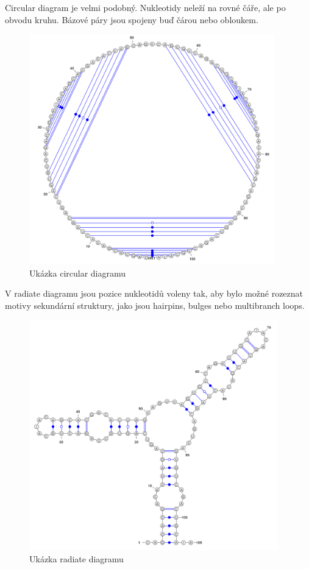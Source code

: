 Circular diagram je velmi podobný. Nukleotidy neleží na rovné čáře, ale po
obvodu kruhu. Bázové páry jsou spojeny buď čárou nebo obloukem.

\begin{figure}[H]
  \centering
  \includegraphics[height=100mm]{../img/kap01/diagrams/circular.png}
  \caption{Ukázka circular diagramu}
\end{figure}

V radiate diagramu jsou pozice nukleotidů voleny tak, aby bylo možné rozeznat
motivy sekundární struktury, jako jsou hairpins, bulges nebo multibranch loops. 

\begin{figure}[H]
  \centering
  \includegraphics[height=100mm]{../img/kap01/diagrams/radiate.png}
  \caption{Ukázka radiate diagramu}
\end{figure}

